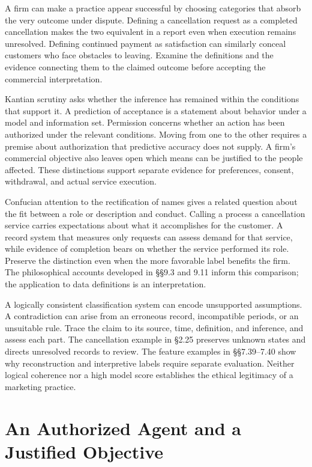 \noindent \noindent A firm can make a practice appear successful by choosing
categories that absorb the very outcome under dispute. Defining a
cancellation request as a completed cancellation makes the two
equivalent in a report even when execution remains unresolved. Defining
continued payment as satisfaction can similarly conceal customers who
face obstacles to leaving. Examine the definitions and the evidence
connecting them to the claimed outcome before accepting the commercial
interpretation.

Kantian scrutiny asks whether the inference has remained within the
conditions that support it. A prediction of acceptance is a statement
about behavior under a model and information set. Permission concerns
whether an action has been authorized under the relevant conditions.
Moving from one to the other requires a premise about authorization that
predictive accuracy does not supply. A firm's commercial objective also
leaves open which means can be justified to the people affected. These
distinctions support separate evidence for preferences, consent,
withdrawal, and actual service execution.

Confucian attention to the rectification of names gives a related
question about the fit between a role or description and conduct.
Calling a process a cancellation service carries expectations about what
it accomplishes for the customer. A record system that measures only
requests can assess demand for that service, while evidence of
completion bears on whether the service performed its role. Preserve the
distinction even when the more favorable label benefits the firm. The
philosophical accounts developed in §§9.3 and 9.11 inform this
comparison; the application to data definitions is an interpretation.

A logically consistent classification system can encode unsupported
assumptions. A contradiction can arise from an erroneous record,
incompatible periods, or an unsuitable rule. Trace the claim to its
source, time, definition, and inference, and assess each part. The
cancellation example in §2.25 preserves unknown states and directs
unresolved records to review. The feature examples in §§7.39--7.40 show
why reconstruction and interpretive labels require separate evaluation.
Neither logical coherence nor a high model score establishes the ethical
legitimacy of a marketing practice.


\hypertarget{M09-an-authorized-agent-and-a-justified-objective}{%
\section{An Authorized Agent and a Justified
Objective}\label{M09-an-authorized-agent-and-a-justified-objective}}


